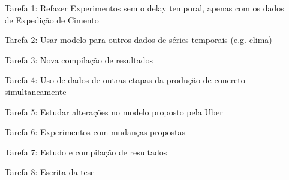 \begin{itemize}

\item[Tarefa 1: ] Refazer Experimentos sem o delay temporal, apenas com os dados
  de Expedição de Cimento
\item[Tarefa 2: ] Usar modelo para outros dados de séries temporais (e.g. clima)
\item[Tarefa 3: ] Nova compilação de resultados
\item[Tarefa 4: ] Uso de dados de outras etapas da produção de concreto simultaneamente
\item[Tarefa 5: ] Estudar alterações no modelo proposto pela Uber  
\item[Tarefa 6: ] Experimentos com mudanças propostas 
\item[Tarefa 7: ] Estudo e compilação de resultados
\item[Tarefa 8: ] Escrita da tese 


  
\end{itemize}


